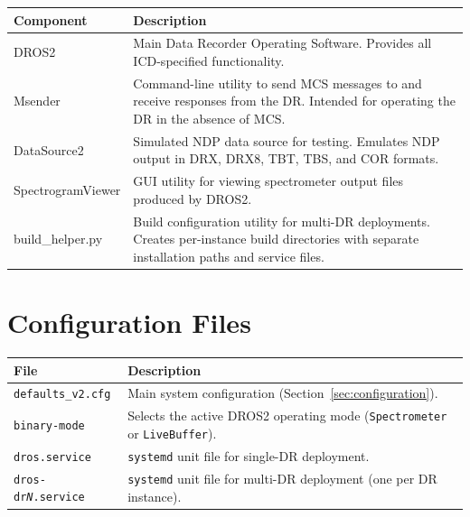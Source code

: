 \begin{longtable}{l p{9cm}}
\toprule
\textbf{Component} & \textbf{Description} \\
\midrule
\endfirsthead
\endhead
\bottomrule
\endfoot

DROS2          & Main Data Recorder Operating Software.  Provides all
                 ICD-specified functionality. \\

Msender        & Command-line utility to send MCS messages to and receive
                 responses from the DR.  Intended for operating the DR in
                 the absence of MCS. \\

DataSource2    & Simulated NDP data source for testing.  Emulates NDP
                 output in DRX, DRX8, TBT, TBS, and COR formats. \\

SpectrogramViewer & GUI utility for viewing spectrometer output files
                    produced by DROS2. \\

build\_helper.py & Build configuration utility for multi-DR deployments.
                   Creates per-instance build directories with separate
                   installation paths and service files. \\

\end{longtable}

\section*{Configuration Files}

\begin{longtable}{l p{9cm}}
\toprule
\textbf{File} & \textbf{Description} \\
\midrule
\endfirsthead
\endhead
\bottomrule
\endfoot

\texttt{defaults\_v2.cfg}
    & Main system configuration (Section~\ref{sec:configuration}). \\

\texttt{binary-mode}
    & Selects the active DROS2 operating mode
      (\texttt{Spectrometer} or \texttt{LiveBuffer}). \\

\texttt{dros.service}
    & \texttt{systemd} unit file for single-DR deployment. \\

\texttt{dros-dr\textit{N}.service}
    & \texttt{systemd} unit file for multi-DR deployment
      (one per DR instance). \\

\end{longtable}

